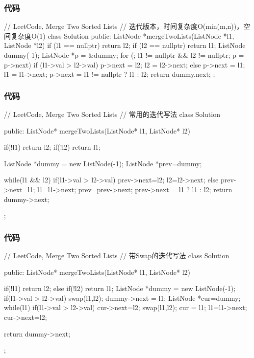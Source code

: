 \subsubsection{代码}
\begin{Code}
// LeetCode, Merge Two Sorted Lists
// 迭代版本，时间复杂度O(min(m,n))，空间复杂度O(1)
class Solution {
public:
    ListNode *mergeTwoLists(ListNode *l1, ListNode *l2) {
        if (l1 == nullptr) return l2;
        if (l2 == nullptr) return l1;
        ListNode dummy(-1);
        ListNode *p = &dummy;
        for (; l1 != nullptr && l2 != nullptr; p = p->next) {
            if (l1->val > l2->val) { p->next = l2; l2 = l2->next; }
            else { p->next = l1; l1 = l1->next; }
        }
        p->next = l1 != nullptr ? l1 : l2;
        return dummy.next;
    }
};
\end{Code}

\subsubsection{代码}
\begin{Code}
// LeetCode, Merge Two Sorted Lists
// 常用的迭代写法
class Solution {
public:
    ListNode* mergeTwoLists(ListNode* l1, ListNode* l2) {
        if(!l1) return l2;
        if(!l2) return l1;
        
        ListNode *dummy = new ListNode(-1);
        ListNode *prev=dummy;
        
        while(l1 && l2) {
            if(l1->val > l2->val) { prev->next=l2; l2=l2->next; }
            else { prev->next=l1; l1=l1->next; }
            prev=prev->next;
        }
        prev->next = l1 ? l1 : l2;
        return dummy->next;
    }
};
\end{Code}

\subsubsection{代码}
\begin{Code}
// LeetCode, Merge Two Sorted Lists
// 带Swap的迭代写法
class Solution {
public:
    ListNode* mergeTwoLists(ListNode* l1, ListNode* l2) {
        if(!l1) return l2;
        else if(!l2) return l1;
        ListNode *dummy = new ListNode(-1);
        if(l1->val > l2->val) swap(l1,l2);
        dummy->next = l1;
        ListNode *cur=dummy;
        while(l1)
        {
            if(l1->val > l2->val)
            {
                cur->next=l2;
                swap(l1,l2);
            }
            cur = l1;
            l1=l1->next;
        }
        cur->next=l2;
        
        return dummy->next;
    }
};
\end{Code}

